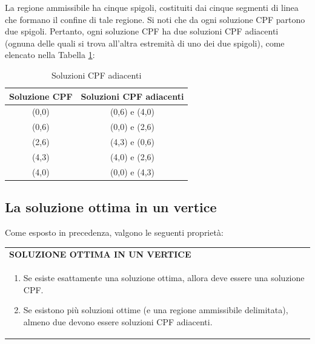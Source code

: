 \documentclass[a4paper]{extarticle}
\renewcommand\arraystretch{}
\begin{document}
\noindent
La regione ammissibile ha cinque spigoli, costituiti dai cinque segmenti di linea che formano il confine di tale regione. Si noti che da ogni soluzione CPF partono due spigoli. Pertanto, ogni soluzione CPF ha due soluzioni CPF adiacenti (ognuna delle quali si trova all'altra estremità di uno dei due spigoli), come elencato nella Tabella \ref{tab:tab1}:

\noindent
\begin{table}[H]
    \setlength{\tabcolsep}{8pt}
    \renewcommand{\arraystretch}{1.5}
    \noindent
    \centering
    \begin{tabular}{c|c}
        \hline
        Soluzione CPF & Soluzioni CPF adiacenti\\
        \hline
        (0,0) & (0,6) e (4,0)\\
        (0,6) & (0,0) e (2,6)\\
        (2,6) & (4,3) e (0,6)\\
        (4,3) & (4,0) e (2,6)\\
        (4,0) & (0,0) e (4,3)\\
        \hline
    \end{tabular}
    \caption{Soluzioni CPF adiacenti}
    \label{tab:tab1}
\end{table}   

\vspace{1em}
\subsection{La soluzione ottima in un vertice}
\label{sec:prop1}
Come esposto in precedenza, valgono le seguenti proprietà:

\vspace{1em}
\setlength{\tabcolsep}{14pt}
\renewcommand{\arraystretch}{2}
\noindent
\begin{tabularx}{\textwidth}{@{}|P|@{}}
    \hline
    {\textbf{SOLUZIONE OTTIMA IN UN VERTICE}}\\
    \parbox{\linewidth}{
        \begin{enumerate}
            \item Se esiste esattamente una soluzione ottima, allora deve essere una soluzione CPF.
            \item Se esistono più soluzioni ottime (e una regione ammissibile delimitata), almeno due devono essere soluzioni CPF adiacenti.
        \end{enumerate}
    \vspace{1mm}}\\
    \hline
\end{tabularx}
\end{document}
